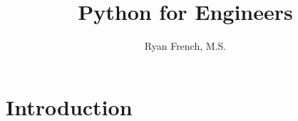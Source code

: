 \documentclass[
    a4paper,
    twoside,
    parskip=full,
    11pt]{scrbook}
\title{Python for Engineers}
\author{Ryan French, M.S.}
\date{}
\begin{document}
\maketitle

\tableofcontents

\chapter{Introduction}

\end{document}

